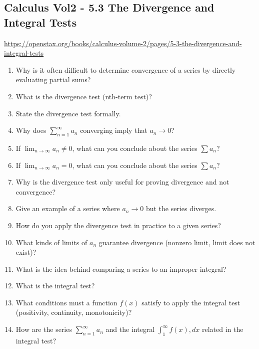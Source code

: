 \subsection{Calculus Vol2 - 5.3 The Divergence and Integral Tests}

\url{https://openstax.org/books/calculus-volume-2/pages/5-3-the-divergence-and-integral-tests}

\begin{enumerate}

\item Why is it often difficult to determine convergence of a series by directly evaluating partial sums?

\item What is the divergence test (nth-term test)?

\item State the divergence test formally.

\item Why does $\sum_{n=1}^{\infty} a_n$ converging imply that $a_n \to 0$?

\item If $\lim_{n\to\infty} a_n \neq 0$, what can you conclude about the series $\sum a_n$?

\item If $\lim_{n\to\infty} a_n = 0$, what can you conclude about the series $\sum a_n$?

\item Why is the divergence test only useful for proving divergence and not convergence?

\item Give an example of a series where $a_n \to 0$ but the series diverges.

\item How do you apply the divergence test in practice to a given series?

\item What kinds of limits of $a_n$ guarantee divergence (nonzero limit, limit does not exist)?

\item What is the idea behind comparing a series to an improper integral?

\item What is the integral test?

\item What conditions must a function $f(x)$ satisfy to apply the integral test (positivity, continuity, monotonicity)?

\item How are the series $\sum_{n=1}^{\infty} a_n$ and the integral $\int_1^\infty f(x),dx$ related in the integral test?


\end{enumerate}
